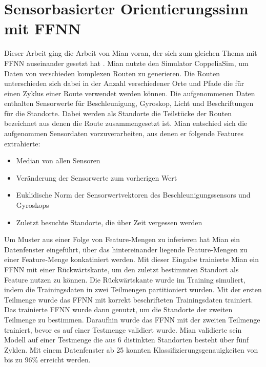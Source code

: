 \section{Sensorbasierter Orientierungssinn mit FFNN}
Dieser Arbeit ging die Arbeit von Mian voran, der sich zum gleichen Thema mit FFNN auseinander gesetzt hat \cite{naveedThesis}.
Mian nutzte den Simulator CoppeliaSim, um Daten von verschieden komplexen Routen zu generieren.
Die Routen unterschieden sich dabei in der Anzahl verschiedener Orte und Pfade die für einen Zyklus einer Route verwendet werden können.
Die aufgenommenen Daten enthalten Sensorwerte für Beschleunigung, Gyroskop, Licht und Beschriftungen für die Standorte.
Dabei werden als Standorte die Teilstücke der Routen bezeichnet aus denen die Route zusammengesetzt ist.
\newline
\newline
Mian entschied sich die aufgenommen Sensordaten vorzuverarbeiten, aus denen er folgende Features extrahierte:
\begin{itemize}
    \item Median von allen Sensoren
    \item Veränderung der Sensorwerte zum vorherigen Wert
    \item Euklidische Norm der Sensorwertvektoren des Beschleunigungssensors und Gyroskops
    \item Zuletzt besuchte Standorte, die über Zeit vergessen werden
\end{itemize}
Um Muster aus einer Folge von Feature-Mengen zu inferieren hat Mian ein Datenfenster eingeführt, über das
hintereinander liegende Feature-Mengen zu einer Feature-Menge konkatiniert werden.
\newline
\newline
Mit dieser Eingabe trainierte Mian ein FFNN mit einer Rückwärtskante, um den zuletzt bestimmten Standort als Feature nutzen zu können.
Die Rückwärtskante wurde im Training simuliert, indem die Trainingsdaten in zwei Teilmengen partitioniert wurden.
Mit der ersten Teilmenge wurde das FFNN mit korrekt beschrifteten Trainingsdaten trainiert.
Das trainierte FFNN wurde dann genutzt, um die Standorte der zweiten Teilmenge zu bestimmen.
Daraufhin wurde das FFNN mit der zweiten Teilmenge trainiert, bevor es auf einer Testmenge validiert wurde.
\newline
\newline
Mian validierte sein Modell auf einer Testmenge die aus 6 distinkten Standorten besteht über fünf Zyklen.
Mit einem Datenfenster ab 25 konnten Klassifizierungsgenauigkeiten von bis zu 96\% erreicht werden.